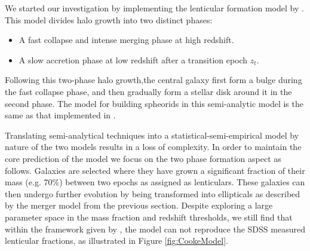 We started our investigation by implementing the lenticular formation model by \citet{Cook2009Two-phaseFormation}. This model divides halo growth into two distinct phases: \begin{itemize}
    \item A fast collapse and intense merging phase at high redshift.
    \item A slow accretion phase at low redshift after a transition epoch $z_{t}$.
\end{itemize}
Following this two-phase halo growth,the central galaxy first form a bulge during the fast collapse phase, and then gradually form a stellar disk around it in the second phase. The model for building spheorids in this semi-analytic model is the same as that implemented in \citet{Granato2004AHosts}. 

Translating semi-analytical techniques into a statistical-semi-empirical model by nature of the two models results in a loss of complexity. In order to maintain the core prediction of the \citet{Cook2009Two-phaseFormation} model we focus on the two phase formation aspect as follows. Galaxies are selected where they have grown a significant fraction of their mass (e.g. 70\%) between two epochs as assigned as lenticulars. These galaxies can then undergo further evolution by being transformed into ellipticals as described by the merger model from the previous section. Despite exploring a large parameter space in the mass fraction and redshift thresholds, we still find that within the framework given by \steel, the \citet{Cook2009Two-phaseFormation} model can not reproduce the SDSS measured lenticular fractions, as illustrated in Figure \ref{fig:CookeModel}.

